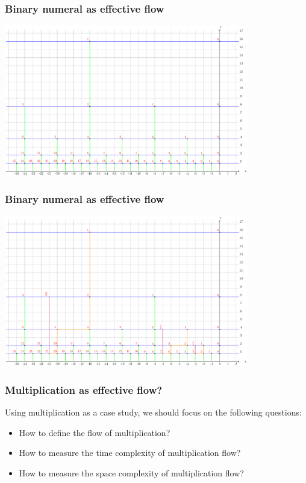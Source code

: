 \documentclass[aspectratio=169]{beamer}
\begin{document}
\begin{frame}
    \frametitle{Binary numeral as effective flow}
    \begin{center}
        \includegraphics[width=0.8\textwidth]{../images/binarynumeral}
    \end{center}
\end{frame}

\begin{frame}
    \frametitle{Binary numeral as effective flow}
    \begin{center}
        \includegraphics[width=0.8\textwidth]{../images/multiplication}
    \end{center}
\end{frame}

\begin{frame}
    \frametitle{Multiplication as effective flow?}
    Using multiplication as a case study, we should focus on the following questions:
    \begin{itemize}
        \item How to define the flow of multiplication?
        \item How to measure the time complexity of multiplication flow?
        \item How to measure the space complexity of multiplication flow?
    \end{itemize}
\end{frame}
\end{document}
